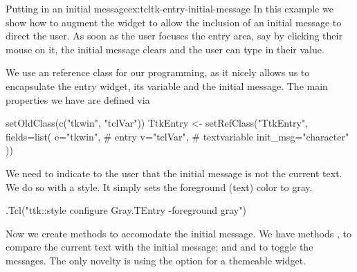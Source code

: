 \begin{example}{Putting in an initial message}{ex:tcltk-entry-initial-message}
In this example we show how to augment the  widget
to allow the inclusion of an initial message to direct the user. As
soon as the user focuses the entry area, say by clicking their mouse
on it, the initial message clears and the user can type in their
value.

We use an \R{} reference class for our programming, as it nicely
allows us to encapsulate the entry widget, its \TCL{} variable and the
initial message. The main properties we have are defined via


\begin{Schunk}
\begin{Sinput}
 setOldClass(c("tkwin", "tclVar"))
 TtkEntry <- setRefClass("TtkEntry",
                         fields=list(
                           e="tkwin",    # entry
                           v="tclVar",   # textvariable
                           init_msg="character"
                           ))
\end{Sinput}
\end{Schunk}
%

We need to indicate to the user that the initial message is not the
current text. We do so with a style. It simply sets the foreground
(text) color to gray.

\begin{Schunk}
\begin{Sinput}
 .Tcl("ttk::style configure Gray.TEntry -foreground gray") 
\end{Sinput}
\end{Schunk}

%
Now we create methods to accomodate the initial message. We have
methods , to compare the current text with the
initial message; and  and 
to toggle the messages. The only novelty is using the
 option for a themeable widget.
\begin{Schunk}
\end{Schunk}


\end{example}

